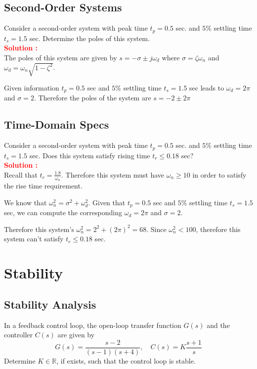 \documentclass[12pt]{article}
\begin{document}
\subsection{Second-Order Systems}

Consider a second-order system with peak time $t_p = 0.5$ sec. and $5\%$ settling time $t_s = 1.5$ sec. Determine the poles of this system. \\
\textbf{\textcolor{red}{Solution :}} \\
The poles of this system are given by $s= -\sigma \pm j \omega_d$ where $\sigma=\zeta \omega_n$ and $\omega_d=\omega_n \sqrt{1-\zeta^2}$.

Given information $t_p = 0.5$ sec and $5\%$ settling time $t_s = 1.5$ sec leads to $\omega_d=2 \pi$ and $\sigma=2$. Therefore the poles of the system are $s=-2 \pm 2 \pi $

\clearpage
\subsection{Time-Domain Specs}

Consider a second-order system with peak time $t_p = 0.5$ sec. and $5\%$ settling time $t_s = 1.5$ sec. Does this system satisfy rising time $t_r \leq 0.18$ sec? \\
\textbf{\textcolor{red}{Solution :}} \\
Recall that $t_r=\frac{1.8}{\omega_n}$. Therefore this system must have $\omega_n \geq 10$ in order to satisfy the rise time requirement. 

We know that $\omega_n^2 =\sigma^2 +\omega_d^2$. Given that $t_p = 0.5$ sec and $5\%$ settling time $t_s = 1.5$ sec, we can compute the corresponding $\omega_d=2 \pi$ and $\sigma=2$. 

Therefore this system's $\omega_n^2 = 2^2 + (2 \pi)^2 =68$. Since $\omega_n^2 < 100$, therefore this system can't satisfy $t_r \leq 0.18$ sec.  

\clearpage
\section{Stability}
\subsection{Stability Analysis}
In a feedback control loop, the open-loop transfer function \(G(s)\) and the controller \(C(s)\) are given by
\begin{equation}
G(s) = \frac{s - 2}{(s - 1)(s + 4)}, \quad C(s) = K \frac{s + 1}{s}
\end{equation}
Determine \(K \in \mathbb{R}\), if exists, such that the control loop is stable.
\end{document}
